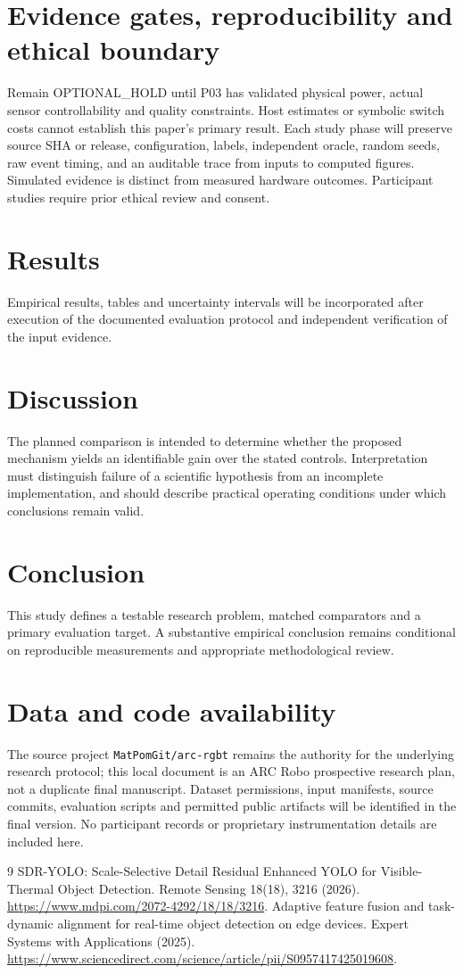 \documentclass[11pt,a4paper]{article}
\begin{document}
\section{Evidence gates, reproducibility and ethical boundary}
Remain OPTIONAL\_HOLD until P03 has validated physical power, actual sensor controllability and quality constraints. Host estimates or symbolic switch costs cannot establish this paper's primary result. Each study phase will preserve source SHA or release, configuration, labels, independent oracle, random seeds, raw event timing, and an auditable trace from inputs to computed figures. Simulated evidence is distinct from measured hardware outcomes. Participant studies require prior ethical review and consent.

\section{Results}
Empirical results, tables and uncertainty intervals will be incorporated after execution of the documented evaluation protocol and independent verification of the input evidence.

\section{Discussion}
The planned comparison is intended to determine whether the proposed mechanism yields an identifiable gain over the stated controls. Interpretation must distinguish failure of a scientific hypothesis from an incomplete implementation, and should describe practical operating conditions under which conclusions remain valid.

\section{Conclusion}
This study defines a testable research problem, matched comparators and a primary evaluation target. A substantive empirical conclusion remains conditional on reproducible measurements and appropriate methodological review.

\section{Data and code availability}
The source project \texttt{MatPomGit/arc-rgbt} remains the authority for the underlying research protocol; this local document is an ARC Robo prospective research plan, not a duplicate final manuscript. Dataset permissions, input manifests, source commits, evaluation scripts and permitted public artifacts will be identified in the final version. No participant records or proprietary instrumentation details are included here.
\begin{thebibliography}{9}
 SDR-YOLO: Scale-Selective Detail Residual Enhanced YOLO for Visible-Thermal Object Detection. Remote Sensing 18(18), 3216 (2026). \url{https://www.mdpi.com/2072-4292/18/18/3216}.
 Adaptive feature fusion and task-dynamic alignment for real-time object detection on edge devices. Expert Systems with Applications (2025). \url{https://www.sciencedirect.com/science/article/pii/S0957417425019608}.
\end{thebibliography}
\end{document}

